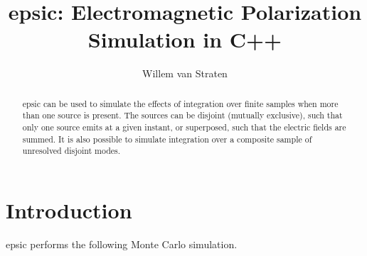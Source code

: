 \documentclass[fullpage]{article}
\begin{document}
\title{ {\sc epsic}: Electromagnetic Polarization Simulation in C++ }

\author{Willem van Straten}

\maketitle

\begin{abstract}

  {\sc epsic} can be used to simulate the effects of integration over finite samples when more than one source is present. The sources can be disjoint (mutually exclusive), such that only one source emits at a given instant, or superposed, such that the electric fields are summed. It is also possible to simulate integration over a composite sample of unresolved disjoint modes.

\end{abstract}



\section {Introduction}

{\sc epsic} performs the following Monte Carlo simulation.
\end{document}
